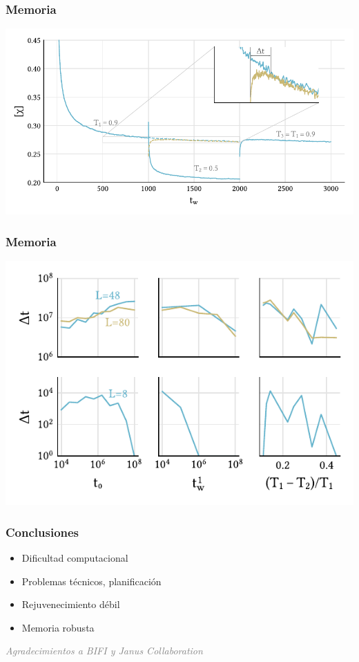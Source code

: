 \documentclass{beamer}
\begin{document}
\begin{frame}
  \frametitle{Memoria}
  \pause
  \includegraphics[width=\textwidth]{../study_cases/memory_toy/memorytoy_handedit.pdf}
\end{frame}

\begin{frame}
  \frametitle{Memoria}
  \includegraphics{../study_cases/memory/dependences_beamer_handedit.pdf}
\end{frame}

\begin{frame}
  \frametitle{Conclusiones}
  \begin{itemize}
  \item Dificultad computacional
  \item Problemas técnicos, planificación
  \item Rejuvenecimiento débil
  \item Memoria robusta
  \end{itemize}

\vfill
\hfill
\textcolor{gray}{\textit{Agradecimientos a BIFI y Janus Collaboration}}

\end{frame}

\begin{frame}

\end{frame}
\end{document}
